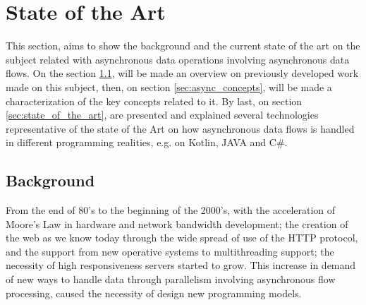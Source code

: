 % 
%  
%
\chapter{State of the Art}
\label{cha:users_manual}

This section, aims to show the background and the current state of the art on the subject related with asynchronous data operations involving asynchronous data flows.  
On the section \ref{sec:related_work}, will be made an overview on previously developed work made on this subject, then, on section \ref{sec:async_concepts}, will be made a characterization of the key concepts related to it. By last, on section \ref{sec:state_of_the_art}, are presented and explained several technologies representative of the state of the Art on how asynchronous data flows is handled in different programming realities, e.g. on Kotlin, JAVA and C\#. 


\section{Background} %
\label{sec:related_work}


From the end of 80’s to the beginning of the 2000’s, with the acceleration of Moore's Law in hardware and network bandwidth development; the creation of the web as we know today through the wide spread of use of the HTTP protocol, and the support from new operative systems to multithreading support; the necessity of high responsiveness servers started to grow. This increase in demand of new ways to handle data through parallelism involving asynchronous flow processing, caused the necessity of design new programming models. 

